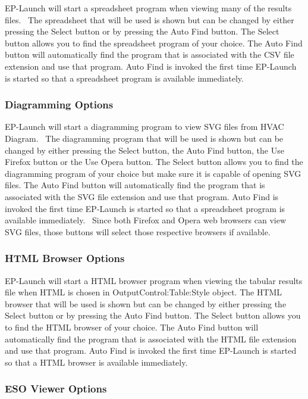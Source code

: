 EP-Launch will start a spreadsheet program when viewing many of the results files.~ The spreadsheet that will be used is shown but can be changed by either pressing the Select button or by pressing the Auto Find button. The Select button allows you to find the spreadsheet program of your choice. The Auto Find button will automatically find the program that is associated with the CSV file extension and use that program. Auto Find is invoked the first time EP-Launch is started so that a spreadsheet program is available immediately.

\subsubsection{Diagramming Options}\label{diagramming-options}

EP-Launch will start a diagramming program to view SVG files from HVAC Diagram.~ The diagramming program that will be used is shown but can be changed by either pressing the Select button, the Auto Find button, the Use Firefox button or the Use Opera button. The Select button allows you to find the diagramming program of your choice but make sure it is capable of opening SVG files. The Auto Find button will automatically find the program that is associated with the SVG file extension and use that program. Auto Find is invoked the first time EP-Launch is started so that a spreadsheet program is available immediately.~ Since both Firefox and Opera web browsers can view SVG files, those buttons will select those respective browsers if available.

\subsubsection{HTML Browser Options}\label{html-browser-options}

EP-Launch will start a HTML browser program when viewing the tabular results file when HTML is chosen in OutputControl:Table:Style object. The HTML browser that will be used is shown but can be changed by either pressing the Select button or by pressing the Auto Find button. The Select button allows you to find the HTML browser of your choice. The Auto Find button will automatically find the program that is associated with the HTML file extension and use that program. Auto Find is invoked the first time EP-Launch is started so that a HTML browser is available immediately.

\subsubsection{ESO Viewer Options}\label{eso-viewer-options}

